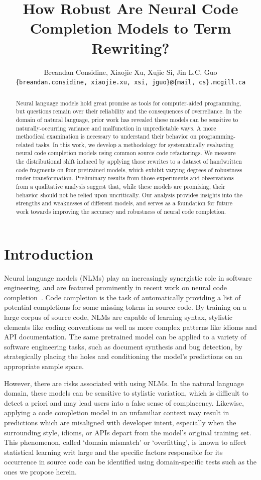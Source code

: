 \documentclass[usenames,dvipsnames]{article} %
\title{How Robust Are Neural Code Completion Models to Term Rewriting?}
\author{Breandan Considine, Xiaojie Xu, Xujie Si, Jin L.C. Guo\\
\texttt{\{breandan.considine, xiaojie.xu, xsi, jguo\}@\{mail, cs\}.mcgill.ca}\\
}
\begin{document}
  \maketitle

  \begin{abstract}
    Neural language models hold great promise as tools for computer-aided programming, but questions remain over their reliability and the consequences of overreliance. In the domain of natural language, prior work has revealed these models can be sensitive to naturally-occurring variance and malfunction in unpredictable ways. A more methodical examination is necessary to understand their behavior on programming-related tasks. In this work, we develop a methodology for systematically evaluating neural code completion models using common source code refactorings. We measure the distributional shift induced by applying those rewrites to a dataset of handwritten code fragments on four pretrained models, which exhibit varying degrees of robustness under transformation. Preliminary results from those experiments and observations from a qualitative analysis suggest that, while these models are promising, their behavior should not be relied upon uncritically. Our analysis provides insights into the strengths and weaknesses of different models, and serves as a foundation for future work towards improving the accuracy and robustness of neural code completion.
  \end{abstract}

  \section{Introduction}\label{sec:introduction}

  Neural language models (NLMs) play an increasingly synergistic role in software engineering, and are featured prominently in recent work on neural code completion~\citep{chen2021evaluating}. Code completion is the task of automatically providing a list of potential completions for some missing tokens in source code. By training on a large corpus of source code, NLMs are capable of learning syntax, stylistic elements like coding conventions as well as more complex patterns like idioms and API documentation. The same pretrained model can be applied to a variety of software engineering tasks, such as document synthesis and bug detection, by strategically placing the holes and conditioning the model's predictions on an appropriate sample space.

  However, there are risks associated with using NLMs. In the natural language domain, these models can be sensitive to stylistic variation, which is difficult to detect a priori and may lead users into a false sense of complacency. Likewise, applying a code completion model in an unfamiliar context may result in predictions which are misaligned with developer intent, especially when the surrounding style, idioms, or APIs depart from the model's original training set. This phenomenon, called `domain mismatch' or `overfitting', is known to affect statistical learning writ large and the specific factors responsible for its occurrence in source code can be identified using domain-specific tests such as the ones we propose herein.
\end{document}
